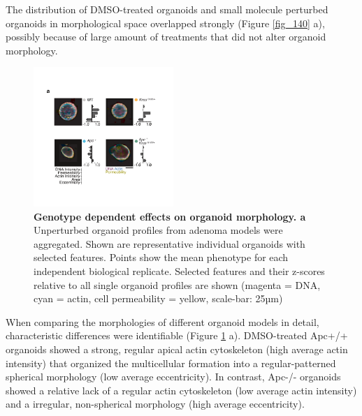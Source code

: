 \begin{flushleft}
The distribution of DMSO-treated organoids and small molecule perturbed organoids in morphological space overlapped strongly (Figure \ref{fig_140} a), possibly because of large amount of treatments that did not alter organoid morphology.

\begin{figure}[h!]
\centering
\includegraphics[width=200,
                height=\textheight,
                keepaspectratio]{figures/adenomaprofiling/pdf/fig_1_3.pdf}
\caption{\textbf{Genotype dependent effects on organoid morphology. a} Unperturbed organoid profiles from adenoma models were aggregated. Shown are representative individual organoids with selected features. Points show the mean phenotype for each independent biological replicate. Selected features and their z-scores relative to all single organoid profiles are shown (magenta = DNA, cyan = actin, cell permeability = yellow, scale-bar: 25µm)}
\label{fig_130}
\end{figure}
\bigbreak

When comparing the morphologies of different organoid models in detail, characteristic differences were identifiable (Figure \ref{fig_130} a). DMSO-treated Apc+/+ organoids showed a strong, regular apical actin cytoskeleton (high average actin intensity) that organized the multicellular formation into a regular-patterned spherical morphology (low average eccentricity). In contrast, Apc-/- organoids showed a relative lack of a regular actin cytoskeleton (low average actin intensity) and a irregular, non-spherical morphology (high average eccentricity). 


\end{flushleft}
